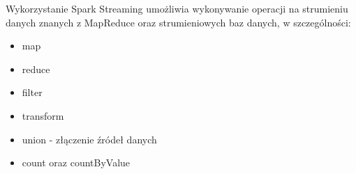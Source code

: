 Wykorzystanie Spark Streaming umożliwia wykonywanie operacji na strumieniu danych znanych z MapReduce oraz strumieniowych baz danych, w szczególności:

\begin{itemize}[noitemsep]
  \item map
  \item reduce
  \item filter
  \item transform
  \item union - złączenie źródeł danych
  \item count oraz countByValue
\end{itemize}
